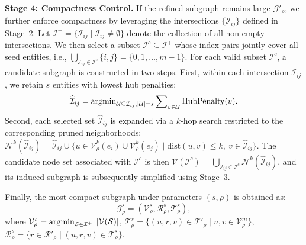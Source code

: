 
\textbf{Stage 4: Compactness Control.}
If the refined subgraph remains large $\mathcal G'_\rho$, we further enforce compactness by leveraging the intersections \small $\{\mathcal{I}_{ij}\}$ \normalsize defined in Stage~2.  
Let \small $\mathcal{I}^+ = \{\mathcal{I}_{ij} \mid \mathcal{I}_{ij} \neq \emptyset\}$ \normalsize denote the collection of all non-empty intersections.  
We then select a subset \small $\mathcal{I}^c \subseteq \mathcal{I}^+$ \normalsize whose index pairs jointly cover all seed entities, i.e.,
\small
$
\bigcup\nolimits_{\mathcal{I}_{ij} \in \mathcal{I}^c} \{i,j\} = \{0,1,\dots,m-1\}.
$
\normalsize
For each valid subset $\mathcal{I}^c$, a candidate subgraph is constructed in two steps.  
First, within each intersection $\mathcal{I}_{ij}$, we retain $s$ entities with lowest hub penalties:
$$
\widehat{\mathcal{I}}_{ij} 
= \operatorname*{argmin}\nolimits_{\substack{\mathcal{U} \subseteq \mathcal{I}_{ij}, |\mathcal{U}| = s}} 
\sum\nolimits_{v \in \mathcal{U}} \mathrm{HubPenalty}(v).
$$
Second, each selected set $\widehat{\mathcal{I}}_{ij}$ is expanded via a $k$-hop search restricted to the corresponding pruned neighborhoods:
\small
$
\mathcal{N}^k(\widehat{\mathcal{I}}_{ij}) 
= \widehat{\mathcal{I}}_{ij} \cup \{ u \in \mathcal{V}_\rho^k(e_i) \cup \mathcal{V}_\rho^k(e_j) \mid \mathrm{dist}(u,v) \leq k ,\ v \in \widehat{\mathcal{I}}_{ij} \}.
$
\normalsize
The candidate node set associated with $\mathcal{I}^c$ is then
\small $\mathcal{V}(\mathcal{I}^c) = \bigcup_{\mathcal{I}_{ij} \in \mathcal{I}^c} \mathcal{N}^k(\widehat{\mathcal{I}}_{ij})$\normalsize,
and its induced subgraph is subsequently simplified using Stage~3.  

Finally, the most compact subgraph under parameters $(s,\rho)$ is obtained as:
\small
\[
\mathcal{G}^{s}_{\rho} = (\mathcal{V}^{s}_{\rho}, \mathcal{R}^{s}_{\rho}, \mathcal{T}^{s}_{\rho}),
\]
\normalsize
where \small $\mathcal{V}^{s}_{\rho} = \operatorname*{argmin}_{\mathcal{S} \in \mathcal{I}^+} \; |\mathcal{V}(\mathcal{S})|$, $\mathcal{T}^{s}_{\rho} \!= \!\{ (u,r,v) \in \mathcal{T}'_{\rho} \mid u,v \in \mathcal{V}^{m}_{\rho} \}$, \small $\mathcal{R}^{s}_{\rho} = \{ r \in \mathcal{R}'_{\rho} \mid (u,r,v) \in \mathcal{T}^{s}_{\rho} \}$\normalsize.


